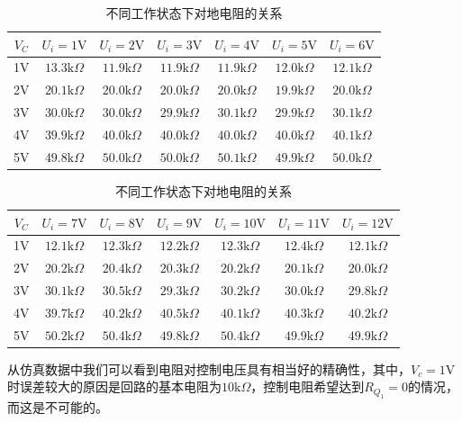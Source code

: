 \documentclass[UTF8,a4paper]{paper}
\begin{document}
\begin{table}[h]
\centering
\caption{不同工作状态下对地电阻的关系}
\label{ttable}
\begin{tabular}{|c|c|c|c|c|c|c|}
\hline
$V_C$&$U_i=1\mathrm{V}$&$U_i=2\mathrm{V}$&$U_i=3\mathrm{V}$&$U_i=4\mathrm{V}$&$U_i=5\mathrm{V}$&$U_i=6\mathrm{V}$\\
\hline
1V&$13.3\mathrm{k}\Omega$&$11.9\mathrm{k}\Omega$&$11.9\mathrm{k}\Omega$&$11.9\mathrm{k}\Omega$&$12.0\mathrm{k}\Omega$&$12.1\mathrm{k}\Omega$\\
\hline
2V&$20.1\mathrm{k}\Omega$&$20.0\mathrm{k}\Omega$&$20.0\mathrm{k}\Omega$&$20.0\mathrm{k}\Omega$&$19.9\mathrm{k}\Omega$&$20.0\mathrm{k}\Omega$\\
\hline
3V&$30.0\mathrm{k}\Omega$&$30.0\mathrm{k}\Omega$&$29.9\mathrm{k}\Omega$&$30.1\mathrm{k}\Omega$&$29.9\mathrm{k}\Omega$&$30.1\mathrm{k}\Omega$\\
\hline
4V&$39.9\mathrm{k}\Omega$&$40.0\mathrm{k}\Omega$&$40.0\mathrm{k}\Omega$&$40.0\mathrm{k}\Omega$&$40.0\mathrm{k}\Omega$&$40.1\mathrm{k}\Omega$\\
\hline
5V&$49.8\mathrm{k}\Omega$&$50.0\mathrm{k}\Omega$&$50.0\mathrm{k}\Omega$&$50.1\mathrm{k}\Omega$&$49.9\mathrm{k}\Omega$&$50.0\mathrm{k}\Omega$\\
\hline
\end{tabular}

\begin{tabular}{|c|c|c|c|c|c|c|}
\hline
$V_C$&$U_i=7\mathrm{V}$&$U_i=8\mathrm{V}$&$U_i=9\mathrm{V}$&$U_i=10\mathrm{V}$&$U_i=11\mathrm{V}$&$U_i=12\mathrm{V}$\\
\hline
1V&$12.1\mathrm{k}\Omega$&$12.3\mathrm{k}\Omega$&$12.2\mathrm{k}\Omega$&$12.3\mathrm{k}\Omega$&$12.4\mathrm{k}\Omega$&$12.1\mathrm{k}\Omega$\\
\hline
2V&$20.2\mathrm{k}\Omega$&$20.4\mathrm{k}\Omega$&$20.3\mathrm{k}\Omega$&$20.2\mathrm{k}\Omega$&$20.1\mathrm{k}\Omega$&$20.0\mathrm{k}\Omega$\\
\hline
3V&$30.1\mathrm{k}\Omega$&$30.5\mathrm{k}\Omega$&$29.3\mathrm{k}\Omega$&$30.2\mathrm{k}\Omega$&$30.0\mathrm{k}\Omega$&$29.8\mathrm{k}\Omega$\\
\hline
4V&$39.7\mathrm{k}\Omega$&$40.2\mathrm{k}\Omega$&$40.5\mathrm{k}\Omega$&$40.1\mathrm{k}\Omega$&$40.3\mathrm{k}\Omega$&$40.2\mathrm{k}\Omega$\\
\hline
5V&$50.2\mathrm{k}\Omega$&$50.4\mathrm{k}\Omega$&$49.8\mathrm{k}\Omega$&$50.4\mathrm{k}\Omega$&$49.9\mathrm{k}\Omega$&$49.9\mathrm{k}\Omega$\\
\hline
\end{tabular}
\end{table}
从仿真数据中我们可以看到电阻对控制电压具有相当好的精确性，其中，$V_c=1\mathrm{V}$时误差较大的原因是回路的基本电阻为$10\mathrm{k}\Omega$，控制电阻希望达到$R_{Q_1}=0$的情况，而这是不可能的。
\end{document}
